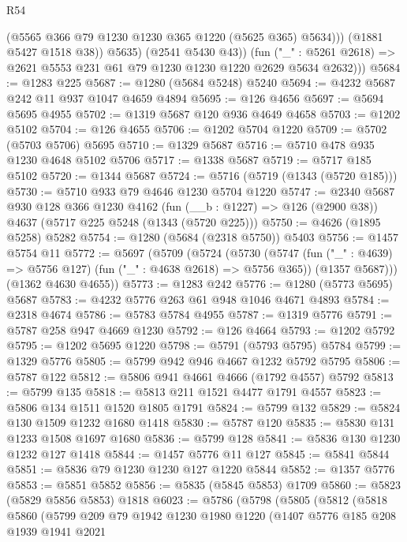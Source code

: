 \begin{lexlean}{R54}
\begin{coremodule}
                  (@5565 @366 @79 @1230 @1230 @365 @1220 (@5625 @365) @5634)))
              (@1881 @5427 @1518 @38))
            @5635)
          (@2541 @5430 @43))
        (fun ("_" : @5261 @2618) => @2621 @5553 @231 @61 @79 @1230 @1230 @1220 @2629 @5634 @2632)))
@5684 := @1283 @225
@5687 := @1280 (@5684 @5248) @5240
@5694 := @4232 @5687 @242 @11 @937 @1047 @4659 @4894
@5695 := @126 @4656
@5697 := @5694 @5695 @4955
@5702 := @1319 @5687 @120 @936 @4649 @4658
@5703 := @1202 @5102
@5704 := @126 @4655
@5706 := @1202 @5704 @1220
@5709 := @5702 (@5703 @5706) @5695
@5710 := @1329 @5687
@5716 := @5710 @478 @935 @1230 @4648 @5102 @5706
@5717 := @1338 @5687
@5719 := @5717 @185 @5102
@5720 := @1344 @5687
@5724 := @5716 (@5719 (@1343 (@5720 @185)))
@5730 := @5710 @933 @79 @4646 @1230 @5704 @1220
@5747 := @2340
    @5687
    @930
    @128
    @366
    @1230
    @4162
    (fun (__b : @1227) => @126 (@2900 @38))
    @4637
    (@5717 @225 @5248 (@1343 (@5720 @225)))
@5750 := @4626 (@1895 @5258) @5282
@5754 := @1280 (@5684 (@2318 @5750)) @5403
@5756 := @1457 @5754 @11
@5772 := @5697
    (@5709
      (@5724
        (@5730
          (@5747 (fun ("_" : @4639) => @5756 @127) (fun ("_" : @4638 @2618) => @5756 @365))
          (@1357 @5687)))
      (@1362 @4630 @4655))
@5773 := @1283 @242
@5776 := @1280 (@5773 @5695) @5687
@5783 := @4232 @5776 @263 @61 @948 @1046 @4671 @4893
@5784 := @2318 @4674
@5786 := @5783 @5784 @4955
@5787 := @1319 @5776
@5791 := @5787 @258 @947 @4669 @1230
@5792 := @126 @4664
@5793 := @1202 @5792
@5795 := @1202 @5695 @1220
@5798 := @5791 (@5793 @5795) @5784
@5799 := @1329 @5776
@5805 := @5799 @942 @946 @4667 @1232 @5792 @5795
@5806 := @5787 @122
@5812 := @5806 @941 @4661 @4666 (@1792 @4557) @5792
@5813 := @5799 @135
@5818 := @5813 @211 @1521 @4477 @1791 @4557
@5823 := @5806 @134 @1511 @1520 @1805 @1791
@5824 := @5799 @132
@5829 := @5824 @130 @1509 @1232 @1680 @1418
@5830 := @5787 @120
@5835 := @5830 @131 @1233 @1508 @1697 @1680
@5836 := @5799 @128
@5841 := @5836 @130 @1230 @1232 @127 @1418
@5844 := @1457 @5776 @11 @127
@5845 := @5841 @5844
@5851 := @5836 @79 @1230 @1230 @127 @1220 @5844
@5852 := @1357 @5776
@5853 := @5851 @5852
@5856 := @5835 (@5845 @5853) @1709
@5860 := @5823 (@5829 @5856 @5853) @1818
@6023 := @5786
    (@5798
      (@5805
        (@5812
          (@5818
            @5860
            (@5799
              @209
              @79
              @1942
              @1230
              @1980
              @1220
              (@1407
                @5776
                @185
                @208
                @1939
                @1941
                @2021

\end{coremodule}
\end{lexlean}
